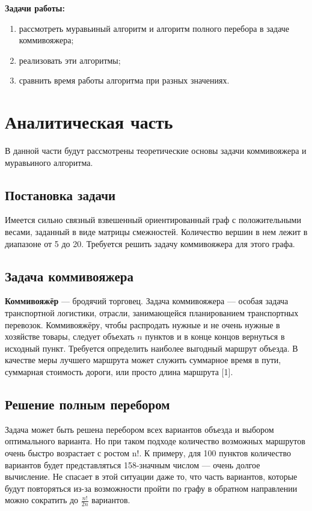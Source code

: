 \documentclass[12pt]{report}
\begin{document}
\textbf{Задачи работы:}
\begin{enumerate}
	\item рассмотреть муравьиный алгоритм и алгоритм полного перебора в задаче коммивояжера;
	\item реализовать эти алгоритмы;
	\item сравнить время работы алгоритма при разных значениях.
\end{enumerate}

\chapter{Аналитическая часть}

В данной части будут рассмотрены теоретические основы задачи коммивояжера и муравьиного алгоритма.

\section{Постановка задачи}

Имеется сильно связный взвешенный ориентированный граф с положительными весами, заданный в виде матрицы смежностей. Количество вершин в нем лежит в диапазоне от 5 до 20. Требуется решить задачу коммивояжера для этого графа. 

\section{Задача коммивояжера}

\textbf{Коммивояжёр} — бродячий торговец. Задача коммивояжера — особая задача транспортной логистики, отрасли, занимающейся планированием транспортных перевозок. Коммивояжёру, чтобы распродать нужные и не очень нужные в хозяйстве товары, следует объехать $n$ пунктов и в конце концов вернуться в исходный пункт. Требуется определить наиболее выгодный маршрут объезда. В качестве меры лучшего маршрута может служить суммарное время в пути, суммарная стоимость дороги, или просто длина маршрута [1].

\section{Решение полным перебором}

Задача может быть решена перебором всех вариантов объезда и выбором оптимального варианта. Но при таком подходе количество возможных маршрутов очень быстро возрастает с ростом n!. К примеру, для 100 пунктов количество вариантов будет представляться 158-значным числом — очень долгое вычисление. Не спасает в этой ситуации даже то, что часть вариантов, которые будут повторяться из-за возможности пройти по графу в обратном направлении можно сократить до $\frac{n!}{2n}$ вариантов.
\end{document}
